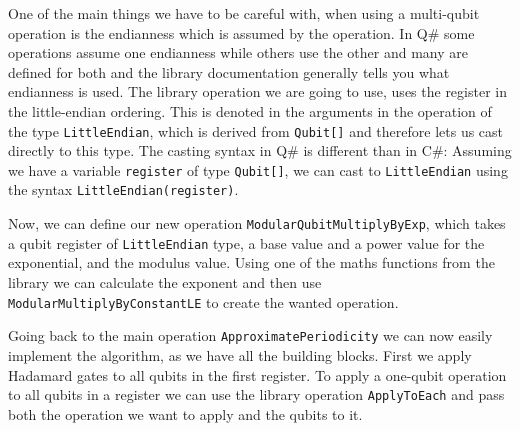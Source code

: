 One of the main things we have to be careful with, when using a multi-qubit operation is the endianness which is assumed by the operation. %
In Q\# some operations assume one endianness while others use the other and many are defined for both and the library documentation generally tells you what endianness is used. The library operation we are going to use, uses the register in the little-endian ordering. This is denoted in the arguments in the operation of the type \texttt{LittleEndian}, which is derived from \texttt{Qubit[]} and therefore lets us cast directly to this type. The casting syntax in Q\# is different than in C\#: Assuming we have a variable \texttt{register} of type \texttt{Qubit[]}, we can cast to \texttt{LittleEndian} using the syntax \texttt{LittleEndian(register)}.

Now, we can define our new operation \texttt{ModularQubitMultiplyByExp}, which takes a qubit register of \texttt{LittleEndian} type, a base value and a power value for the exponential, and the modulus value. Using one of the maths functions from the library we can calculate the exponent and then use \texttt{ModularMultiplyByConstantLE} to create the wanted operation. %



Going back to the main operation \texttt{ApproximatePeriodicity} we can now easily implement the algorithm, as we have all the building blocks. First we apply Hadamard gates to all qubits in the first register. To apply a one-qubit operation to all qubits in a register we can use the library operation \texttt{ApplyToEach} and pass both the operation we want to apply and the qubits to it. 

